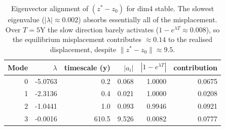 \begin{table}[H]
\centering
\caption{Eigenvector alignment of $(z^* - z_0)$ for dim4 stable. The slowest eigenvalue ($|\lambda| \approx 0.002$) absorbs essentially all of the misplacement. Over $T = 5$Y the slow direction barely activates ($1 - e^{\lambda T} \approx 0.008$), so the equilibrium misplacement contributes $\approx 0.14$ to the realised displacement, despite $\|z^* - z_0\| \approx 9.5$.}
\label{tab:eigenvector_alignment}
\small
\begin{tabular}{rrrrrr}
\toprule
Mode & $\lambda$ & timescale (y) & $|a_i|$ & $|1-e^{\lambda T}|$ & contribution \\
\midrule
0 & -5.0763 & 0.2 & 0.068 & 1.0000 & 0.0675 \\
1 & -2.3136 & 0.4 & 0.021 & 1.0000 & 0.0208 \\
2 & -1.0441 & 1.0 & 0.093 & 0.9946 & 0.0921 \\
3 & -0.0016 & 610.5 & 9.526 & 0.0082 & 0.0777 \\
\bottomrule
\end{tabular}
\end{table}